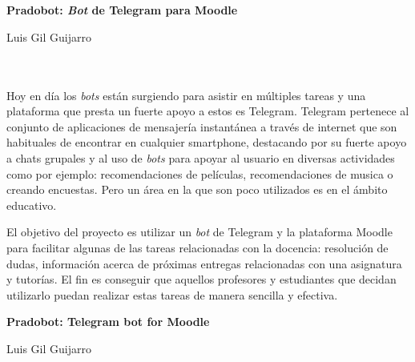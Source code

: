 \chapter*{}


%



\cleardoublepage
\thispagestyle{empty}

\begin{center}
{\large\bfseries Pradobot: \textit{Bot} de Telegram para Moodle}\\
\end{center}
\begin{center}
Luis Gil Guijarro\\
\end{center}

\\

\vspace{0.7cm}
\\

Hoy en día los \textit{bots} están surgiendo para asistir en múltiples tareas y una plataforma que presta un fuerte apoyo a estos es Telegram. Telegram pertenece al conjunto de aplicaciones de mensajería instantánea a través de internet que son habituales de encontrar en cualquier smartphone, destacando por su fuerte apoyo a chats grupales y al uso de \textit{bots} para apoyar al usuario en diversas actividades como por ejemplo: recomendaciones de películas, recomendaciones de musica o creando encuestas. Pero un área en la que son poco utilizados es en el ámbito educativo.\par

 El objetivo del proyecto es utilizar un \textit{bot} de Telegram y la plataforma Moodle para  facilitar  algunas de las tareas relacionadas con la docencia: resolución de dudas, información acerca de próximas entregas relacionadas con una asignatura y tutorías. El fin es conseguir que aquellos profesores y estudiantes que decidan utilizarlo puedan realizar estas tareas de manera sencilla y efectiva.
 
\cleardoublepage


\thispagestyle{empty}


\begin{center}
{\large\bfseries Pradobot: Telegram bot for Moodle}\\
\end{center}
\begin{center}
Luis Gil Guijarro\\
\end{center}

